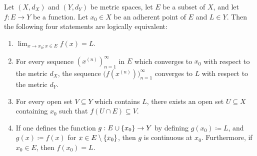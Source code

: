 \begin{prop}\label{3.1.5}
  Let \((X, d_X)\) and \((Y, d_Y)\) be metric spaces, let \(E\) be a subset of \(X\), and let \(f : E \to Y\) be a function.
  Let \(x_0 \in X\) be an adherent point of \(E\) and \(L \in Y\).
  Then the following four statements are logically equivalent:
  \begin{enumerate}
    \item \(\lim_{x \to x_0 ; x \in E} f(x) = L\).
    \item For every sequence \((x^{(n)})_{n = 1}^\infty\) in \(E\) which converges to \(x_0\) with respect to the metric \(d_X\), the sequence \(\big(f(x^{(n)})\big)_{n = 1}^\infty\) converges to \(L\) with respect to the metric \(d_Y\).
    \item For every open set \(V \subseteq Y\) which contains \(L\), there exists an open set \(U \subseteq X\) containing \(x_0\) such that \(f(U \cap E) \subseteq V\).
    \item If one defines the function \(g : E \cup \left\lbrace x_0\right\rbrace \to Y\) by defining \(g(x_0) \coloneqq L\), and \(g(x) \coloneqq f(x)\) for \(x \in E \setminus \left\lbrace x_0\right\rbrace\), then \(g\) is continuous at \(x_0\).
          Furthermore, if \(x_0 \in E\), then \(f(x_0) = L\).
  \end{enumerate}
\end{prop}

